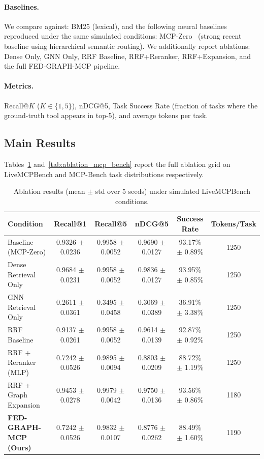 \documentclass[conference]{IEEEtran}
\begin{document}
\paragraph{Baselines.}
We compare against: BM25 (lexical), and the following neural
baselines reproduced under the same simulated conditions:
MCP-Zero~\cite{fei2025mcpzero} (strong recent baseline using
hierarchical semantic routing). We additionally report ablations:
Dense Only, GNN Only, RRF Baseline, RRF+Reranker, RRF+Expansion,
and the full FED-GRAPH-MCP pipeline.

\paragraph{Metrics.}
Recall@$K$ ($K \in \{1, 5\}$), nDCG@5, Task Success Rate (fraction
of tasks where the ground-truth tool appears in top-5), and average
tokens per task.

\subsection{Main Results}

Tables~\ref{tab:ablation_livemcpbench} and~\ref{tab:ablation_mcp_bench} report the full
ablation grid on LiveMCPBench and MCP-Bench task distributions
respectively.

\begin{table}[htbp]
\centering
\caption{Ablation results (mean $\pm$ std over 5 seeds) under simulated LiveMCPBench conditions.\protect\footnotemark}
\label{tab:ablation_livemcpbench}
\begin{tabular}{lccccc}
\hline
Condition & Recall@1 & Recall@5 & nDCG@5 & Success Rate & Tokens/Task \\
\hline
Baseline (MCP-Zero) & 0.9326 $\pm$ 0.0236 & 0.9958 $\pm$ 0.0052 & 0.9690 $\pm$ 0.0127 & 93.17\% $\pm$ 0.89\% & 1250 \\
Dense Retrieval Only & 0.9684 $\pm$ 0.0231 & 0.9958 $\pm$ 0.0052 & 0.9836 $\pm$ 0.0127 & 93.95\% $\pm$ 0.85\% & 1250 \\
GNN Retrieval Only & 0.2611 $\pm$ 0.0361 & 0.3495 $\pm$ 0.0458 & 0.3069 $\pm$ 0.0389 & 36.91\% $\pm$ 3.38\% & 1250 \\
RRF Baseline & 0.9137 $\pm$ 0.0261 & 0.9958 $\pm$ 0.0052 & 0.9614 $\pm$ 0.0139 & 92.87\% $\pm$ 0.92\% & 1250 \\
RRF + Reranker (MLP) & 0.7242 $\pm$ 0.0526 & 0.9895 $\pm$ 0.0094 & 0.8803 $\pm$ 0.0209 & 88.72\% $\pm$ 1.19\% & 1250 \\
RRF + Graph Expansion & 0.9453 $\pm$ 0.0278 & 0.9979 $\pm$ 0.0042 & 0.9750 $\pm$ 0.0136 & 93.56\% $\pm$ 0.86\% & 1180 \\
\textbf{FED-GRAPH-MCP (Ours)} & 0.7242 $\pm$ 0.0526 & 0.9832 $\pm$ 0.0107 & 0.8776 $\pm$ 0.0262 & 88.49\% $\pm$ 1.60\% & 1190 \\
\hline
\end{tabular}
\end{table}
\end{document}
